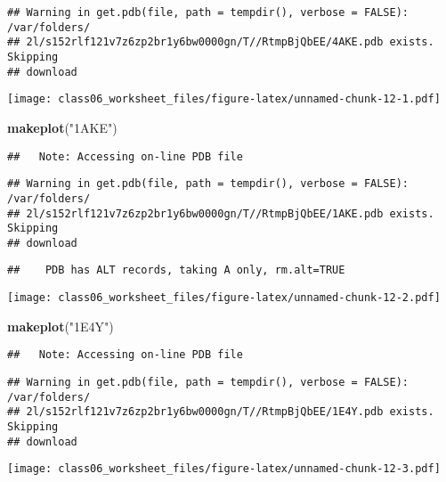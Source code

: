 \documentclass[]{article}
\newenvironment{Shaded}{\begin{snugshade}}{\end{snugshade}}
\newcommand{\KeywordTok}[1]{\textcolor[rgb]{0.13,0.29,0.53}{\textbf{#1}}}
\newcommand{\StringTok}[1]{\textcolor[rgb]{0.31,0.60,0.02}{#1}}
\newcommand{\NormalTok}[1]{#1}
\begin{document}
\begin{verbatim}
## Warning in get.pdb(file, path = tempdir(), verbose = FALSE): /var/folders/
## 2l/s152rlf121v7z6zp2br1y6bw0000gn/T//RtmpBjQbEE/4AKE.pdb exists. Skipping
## download
\end{verbatim}

\texttt{[image: class06\_worksheet\_files/figure-latex/unnamed-chunk-12-1.pdf]}

\begin{Shaded}
\begin{Highlighting}[]
\KeywordTok{makeplot}\NormalTok{(}\StringTok{"1AKE"}\NormalTok{)}
\end{Highlighting}
\end{Shaded}

\begin{verbatim}
##   Note: Accessing on-line PDB file
\end{verbatim}

\begin{verbatim}
## Warning in get.pdb(file, path = tempdir(), verbose = FALSE): /var/folders/
## 2l/s152rlf121v7z6zp2br1y6bw0000gn/T//RtmpBjQbEE/1AKE.pdb exists. Skipping
## download
\end{verbatim}

\begin{verbatim}
##    PDB has ALT records, taking A only, rm.alt=TRUE
\end{verbatim}

\texttt{[image: class06\_worksheet\_files/figure-latex/unnamed-chunk-12-2.pdf]}

\begin{Shaded}
\begin{Highlighting}[]
\KeywordTok{makeplot}\NormalTok{(}\StringTok{"1E4Y"}\NormalTok{)}
\end{Highlighting}
\end{Shaded}

\begin{verbatim}
##   Note: Accessing on-line PDB file
\end{verbatim}

\begin{verbatim}
## Warning in get.pdb(file, path = tempdir(), verbose = FALSE): /var/folders/
## 2l/s152rlf121v7z6zp2br1y6bw0000gn/T//RtmpBjQbEE/1E4Y.pdb exists. Skipping
## download
\end{verbatim}

\texttt{[image: class06\_worksheet\_files/figure-latex/unnamed-chunk-12-3.pdf]}
\end{document}
